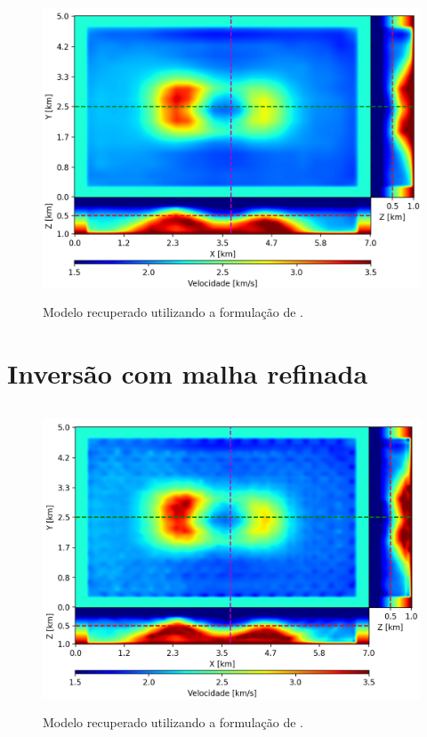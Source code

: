 \begin{figure}[H]
	\centering
	\includegraphics[width=12cm,height=9cm]{Imgs/Resultados/fsm_sparse.png}
	\caption{Modelo recuperado utilizando a formulação de .}
	\label{fig:fsm_sparse}	
\end{figure}


\section{Inversão com malha refinada}

\begin{figure}[H]
	\centering
	\includegraphics[width=12cm,height=9cm]{Imgs/Resultados/pod_refined.png}
	\caption{Modelo recuperado utilizando a formulação de .}
	\label{fig:pod_refined}	
\end{figure}


